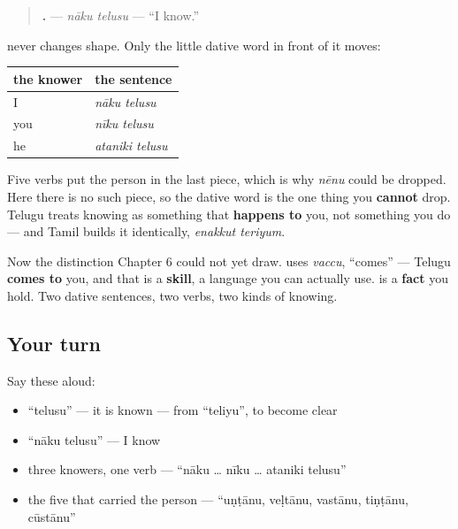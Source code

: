 \begin{grammarlens}[title={Grammar Lens: no person on the verb, so the person moves}]
\begin{quote}
\textbf{ .} — \emph{nāku telusu} — \textquotedblleft{}I know.\textquotedblright{}
\end{quote}

\textbf{} never changes shape. Only the little dative word in front of it moves:

\noindent
\begin{tabularx}{\linewidth}{@{}>{\raggedright\arraybackslash}X>{\raggedright\arraybackslash}X@{}}
\toprule
\textbf{the knower} & \textbf{the sentence} \\
\midrule
I & \emph{nāku telusu} \\
you & \emph{nīku telusu} \\
he & \emph{ataniki telusu} \\
\bottomrule
\end{tabularx}

Five verbs put the person in the last piece, which is why \emph{nēnu} could be dropped. Here there is no such piece, so the dative word is the one thing you \textbf{cannot} drop. Telugu treats knowing as something that \textbf{happens to} you, not something you do — and Tamil builds it identically, \emph{enakkut teriyum}.

Now the distinction Chapter 6 could not yet draw. \textbf{  } uses \emph{vaccu}, \textquotedblleft{}comes\textquotedblright{} — Telugu \textbf{comes to} you, and that is a \textbf{skill}, a language you can actually use. \textbf{ } is a \textbf{fact} you hold. Two dative sentences, two verbs, two kinds of knowing.
\end{grammarlens}

\subsection*{Your turn}
Say these aloud:

\begin{itemize}
\raggedright
  \item \textquotedblleft{}telusu\textquotedblright{} — it is known — from \textquotedblleft{}teliyu\textquotedblright{}, to become clear
  \item \textquotedblleft{}nāku telusu\textquotedblright{} — I know
  \item three knowers, one verb — \textquotedblleft{}nāku … nīku … ataniki telusu\textquotedblright{}
  \item the five that carried the person — \textquotedblleft{}uṇṭānu, veḷtānu, vastānu, tiṇṭānu, cūstānu\textquotedblright{}
\end{itemize}

